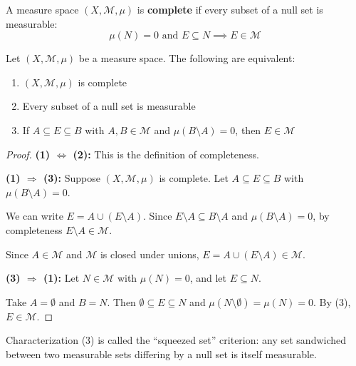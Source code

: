 \begin{definition}
    A measure space $(X, \mathcal{M}, \mu)$ is \textbf{complete} if every subset of a null set 
    is measurable:
    \[
        \mu(N) = 0 \text{ and } E \subseteq N \implies E \in \mathcal{M}
    \]
\end{definition}

\bigskip
\begin{theorem}
    Let $(X, \mathcal{M}, \mu)$ be a measure space. The following are equivalent:
    \begin{enumerate}
        \item $(X, \mathcal{M}, \mu)$ is complete
        \item Every subset of a null set is measurable
        \item If $A \subseteq E \subseteq B$ with $A, B \in \mathcal{M}$ and $\mu(B \setminus A) = 0$, 
            then $E \in \mathcal{M}$
    \end{enumerate}
\end{theorem}

\begin{proof}
    \textbf{(1) $\Leftrightarrow$ (2):} This is the definition of completeness.

    \medskip
    \textbf{(1) $\Rightarrow$ (3):} Suppose $(X, \mathcal{M}, \mu)$ is complete. 
    Let $A \subseteq E \subseteq B$ with $\mu(B \setminus A) = 0$.
    
    We can write $E = A \cup (E \setminus A)$. Since $E \setminus A \subseteq B \setminus A$ 
    and $\mu(B \setminus A) = 0$, by completeness $E \setminus A \in \mathcal{M}$.
    
    Since $A \in \mathcal{M}$ and $\mathcal{M}$ is closed under unions, 
    $E = A \cup (E \setminus A) \in \mathcal{M}$.

    \medskip
    \textbf{(3) $\Rightarrow$ (1):} Let $N \in \mathcal{M}$ with $\mu(N) = 0$, and let $E \subseteq N$.
    
    Take $A = \emptyset$ and $B = N$. Then $\emptyset \subseteq E \subseteq N$ and 
    $\mu(N \setminus \emptyset) = \mu(N) = 0$. By (3), $E \in \mathcal{M}$.
\end{proof}

\begin{remark}
    Characterization (3) is called the ``squeezed set'' criterion: any set sandwiched between 
    two measurable sets differing by a null set is itself measurable.
\end{remark}

